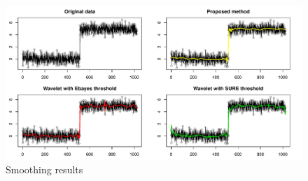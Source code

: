\documentclass[preprint, review, 12pt]{article}
\theoremstyle{definition}
\theoremstyle{remark}
\begin{document}
\begin{figure}
	\centering
	\includegraphics[width=1\textwidth]{Fig/snow_ex2_fig2.pdf}
	\caption{Smoothing results} 
	\label{snow:ex2_2}
\end{figure}
\fi 
\end{document}
